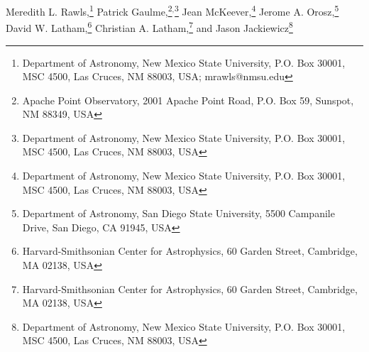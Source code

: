 
Meredith L. Rawls,\footnote{Department of Astronomy, New Mexico State University, P.O. Box 30001, MSC 4500, Las Cruces, NM 88003, USA; mrawls@nmsu.edu}
\setcounter{footnote}{1}
Patrick Gaulme,\footnote{Apache Point Observatory, 2001 Apache Point Road, P.O. Box 59, Sunspot, NM 88349, USA}\setcounter{footnote}{0}$^{,}$\footnote{Department of Astronomy, New Mexico State University, P.O. Box 30001, MSC 4500, Las Cruces, NM 88003, USA}
\setcounter{footnote}{0}
Jean McKeever,\footnote{Department of Astronomy, New Mexico State University, P.O. Box 30001, MSC 4500, Las Cruces, NM 88003, USA}
\setcounter{footnote}{2}
Jerome A. Orosz,\footnote{Department of Astronomy, San Diego State University, 5500 Campanile Drive, San Diego, CA 91945, USA}
David W. Latham,\footnote{Harvard-Smithsonian Center for Astrophysics, 60 Garden Street, Cambridge, MA 02138, USA}
\setcounter{footnote}{3}
Christian A. Latham,\footnote{Harvard-Smithsonian Center for Astrophysics, 60 Garden Street, Cambridge, MA 02138, USA} and 
\setcounter{footnote}{0}
Jason Jackiewicz\footnote{Department of Astronomy, New Mexico State University, P.O. Box 30001, MSC 4500, Las Cruces, NM 88003, USA}
